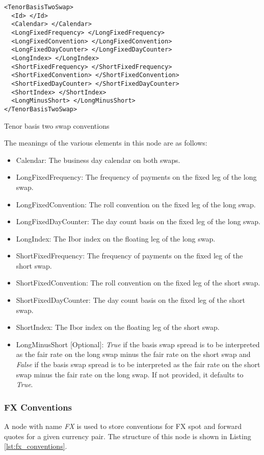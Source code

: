 \begin{listing}[H]
\begin{verbatim}
<TenorBasisTwoSwap>
  <Id> </Id>
  <Calendar> </Calendar>
  <LongFixedFrequency> </LongFixedFrequency>
  <LongFixedConvention> </LongFixedConvention>
  <LongFixedDayCounter> </LongFixedDayCounter>
  <LongIndex> </LongIndex>
  <ShortFixedFrequency> </ShortFixedFrequency>
  <ShortFixedConvention> </ShortFixedConvention>
  <ShortFixedDayCounter> </ShortFixedDayCounter>
  <ShortIndex> </ShortIndex>
  <LongMinusShort> </LongMinusShort>
</TenorBasisTwoSwap>
\end{verbatim}
\caption{Tenor basis two swap conventions}
\label{lst:tenor_basis_two_conventions}
\end{listing}

The meanings of the various elements in this node are as follows:
\begin{itemize}
\item Calendar: The business day calendar on both swaps.
\item LongFixedFrequency: The frequency of payments on the fixed leg of the long swap.
\item LongFixedConvention: The roll convention on the fixed leg of the long swap.
\item LongFixedDayCounter: The day count basis on the fixed leg of the long swap.
\item LongIndex: The Ibor index on the floating leg of the long swap.
\item ShortFixedFrequency: The frequency of payments on the fixed leg of the short swap.
\item ShortFixedConvention: The roll convention on the fixed leg of the short swap.
\item ShortFixedDayCounter: The day count basis on the fixed leg of the short swap.
\item ShortIndex: The Ibor index on the floating leg of the short swap.
\item LongMinusShort [Optional]: \emph{True} if the basis swap spread is to be interpreted as the fair rate on the long
swap minus the fair rate on the short swap and \emph{False} if the basis swap spread is to be interpreted as the fair
rate on the short swap minus the fair rate on the long swap. If not provided, it defaults to \emph{True}.
\end{itemize}

\subsubsection{FX Conventions}
A node with name \emph{FX} is used to store conventions for FX spot and forward quotes for a given currency pair. The
structure of this node is shown in Listing \ref{lst:fx_conventions}.

